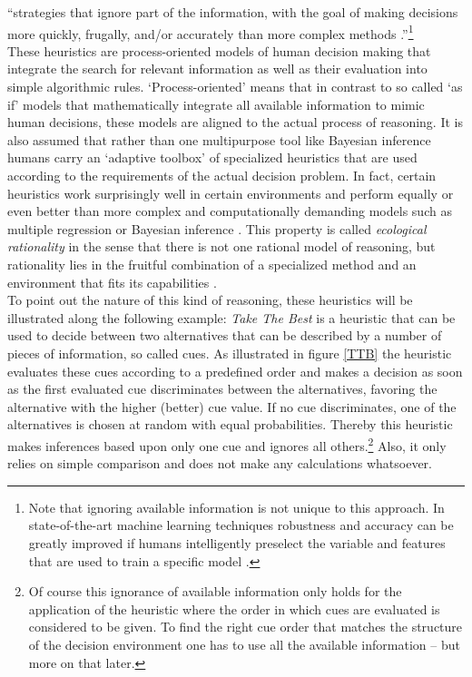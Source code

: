 ``strategies that ignore part of the information, with the goal of making decisions more quickly, frugally, and/or accurately than more complex methods \citep{Gigerenzer2011}.''\footnote{Note that ignoring available information is not unique to this approach. In state-of-the-art machine learning techniques robustness and accuracy can be greatly improved if humans intelligently preselect the variable and features that are used to train a specific model \citep{Guyon2003}.} \\

These heuristics are process-oriented models of human decision making that integrate the search for relevant information as well as their evaluation into simple algorithmic rules. `Process-oriented' means that in contrast to so called `as if' models that mathematically integrate all available information to mimic human decisions, these models are aligned to the actual process of reasoning. It is also assumed that rather than one multipurpose tool like Bayesian inference humans carry an `adaptive toolbox' of specialized heuristics \citep{gigerenzer2002bounded} that are used according to the requirements of the actual decision problem.
In fact, certain heuristics work surprisingly well in certain environments and perform equally or even better than more complex and computationally demanding models such as multiple regression or Bayesian inference \citep{Gigerenzer2009}. This property is called \emph{ecological rationality} in the sense that there is not one rational model of reasoning, but rationality lies in the fruitful combination of a specialized method and an environment that fits its capabilities \citep{todd2007environments}.\\
To point out the nature of this kind of reasoning, these heuristics will be illustrated along the following example: \emph{Take The Best} \citep{Gigerenzer1996} is a heuristic that can be used to decide between two alternatives that can be described by a number of pieces of information, so called cues. As illustrated in figure \ref{TTB} the heuristic evaluates these cues according to a predefined order and makes a decision as soon as the first evaluated cue discriminates between the alternatives, favoring the alternative with the higher (better) cue value. If no cue discriminates, one of the alternatives is chosen at random with equal probabilities. Thereby this heuristic makes inferences based upon only one cue and ignores all others.\footnote{Of course this ignorance of available information only holds for the application of the heuristic where the order in which cues are evaluated is considered to be given. To find the right cue order that matches the structure of the decision environment one has to use all the available information -- but more on that later.} Also, it only relies on simple comparison and does not make any calculations whatsoever.\\
